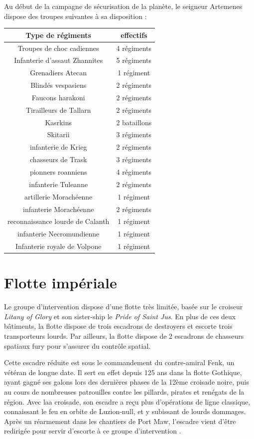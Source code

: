 \documentclass[10pt,a4paper]{book}
\begin{document}
 Au début de la campagne de sécurisation de la planète, le seigneur Artemenes dispose des troupes suivantes à sa disposition :
\begin{center}
\begin{tabular}{c|c}
Type de régiments & effectifs \\ \hline
Troupes de choc cadiennes & 4 régiments\\
Infanterie d'assaut Zhannites & 5 régiments\\ %
Grenadiers Atecan & 1 régiment \\
Blindés vespasiens & 2 régiments \\
Faucons harakoni & 2 régiments \\
Tirailleurs de Tallarn & 2 régiments \\ %
Kasrkins & 2 bataillons\\
Skitarii & 3 régiments \\
infanterie de Krieg & 2 régiments\\
chasseurs de Trask & 3 régiments \\
pionners roanniens & 4 régiments \\%
infanterie Tuleanne  & 2 régiments\\
artillerie Morachéenne & 1 régiment\\
infanterie Morachéenne & 2 régiments \\
reconnaissance lourde de Calanth & 1 régiment\\
infanterie Necromundienne & 1 régiment\\
Infanterie royale de Volpone & 1 régiment
\end{tabular}
\end{center}

\section{Flotte impériale}
Le groupe d'intervention dispose d'une flotte très limitée, basée sur le croiseur \emph{Litany of Glory} et son sister-ship le \emph{Pride of Saint Jus}. En plus de ces deux bâtiments, la flotte dispose de trois escadrons de destroyers et escorte trois transporteurs lourds. Par ailleurs, la flotte dispose de 2 escadrons de chasseurs spatiaux fury pour s'assurer du contrôle spatial.


Cette escadre réduite est sous le commandement du contre-amiral Fenk, un vétéran de longue date. Il sert en effet depuis 125 ans dans la flotte Gothique, ayant gagné ses galons lors des dernières phases de la 12ème croisade noire, puis au cours de nombreuses patrouilles contre les pillards, pirates et renégats de la région. Avec laa croisade, son escadre a reçu plus d'opérations de ligne classique, connaissant le feu en orbite de Luzion-null, et y subissant de lourds dommages. Après un réarmement dans les chantiers de Port Maw, l'escadre vient d'être redirigée pour servir d'escorte à ce groupe d'intervention .
\end{document}

